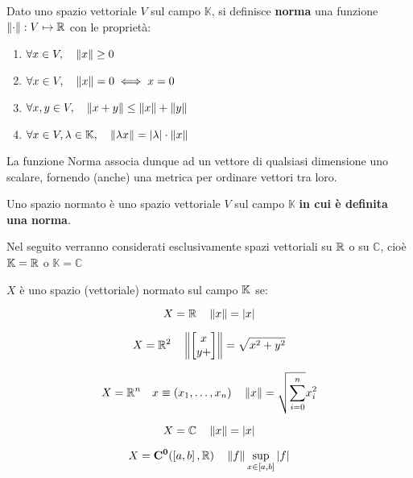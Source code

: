 \begin{definition}[Norma]
	\label{def:norma}
	Dato uno spazio vettoriale $V$ sul campo $\mathbb{K}$, si definisce \textbf{norma} una funzione $\left\|\cdot\right\|:V\mapsto\mathbb{R}$ con le proprietà:
	\begin{enumerate}
		\item $\forall x\in V,\quad\left\|x\right\|\ge0$
		\item $\forall x\in V,\quad\left\|x\right\|=0\iff x=0$
		\item $\forall x,y\in V,\quad\left\|x+y\right\|\le\left\|x\right\|+\left\|y\right\|$
		\item $\forall x\in V,\lambda\in\mathbb{K},\quad\left\|\lambda x\right\|=\left|\lambda\right|\cdot\left\|x\right\|$
	\end{enumerate}
	\begin{note}
		La funzione Norma associa dunque ad un vettore di qualsiasi dimensione uno scalare, fornendo (anche) una metrica per ordinare vettori tra loro.
	\end{note}
\end{definition}
\begin{definition}
	Uno spazio normato è uno spazio vettoriale $V$ sul campo $\mathbb{K}$ \textbf{in cui è definita una norma}.
	\begin{note}
		Nel seguito verranno considerati esclusivamente spazi vettoriali su $\mathbb{R}$ o su $\mathbb{C}$, cioè $\mathbb{K} = \mathbb{R}$ o $\mathbb{K} = \mathbb{C}$
	\end{note}
\end{definition}
$X$ è uno spazio (vettoriale) normato sul campo $\mathbb{K}$ se:
\begin{example}
$$X=\mathbb{R}\quad\left\|x\right\|=\left|x\right|$$
\end{example}
\begin{example}
	$$X=\mathbb{R}^{2}\quad\left\|\left[\begin{matrix}x\\y+\end{matrix}\right]\right\|=\sqrt{x^2+y^2}$$
\end{example}
\begin{example}
	$$X=\mathbb{R}^{n}\quad x\equiv(x_1,\ldots,x_n)\quad \left\|x\right\|=\sqrt{\sum\limits_{i=0}^n}x_i^2$$
\end{example}
\begin{example}
	$$X=\mathbb{C}\quad\left\|x\right\|=\left|x\right|$$
\end{example}
\begin{example}
	$$X=\mathbf{C^{0}}(\left[a,b\right],\mathbb{R})\quad\left\|f\right\|\sup\limits_{x\in\left[a,b\right]}\left|f\right|$$
\end{example}

